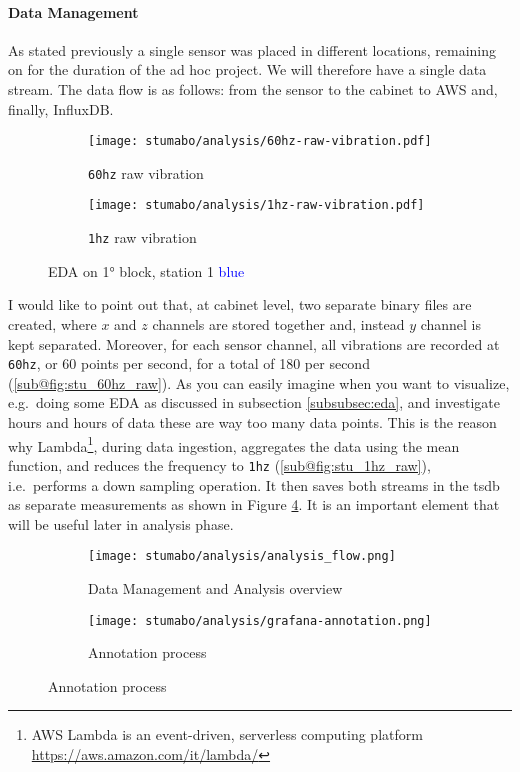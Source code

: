 \paragraph{Data Management}
As stated previously a single sensor was placed in different locations, remaining on for the duration of the ad hoc project. We will therefore have a single data stream.
The data flow is as follows: from the sensor to the cabinet to AWS and, finally, InfluxDB.
\begin{figure}[ht]
    \begin{subfigure}{.495\textwidth}
        \texttt{[image: stumabo/analysis/60hz-raw-vibration.pdf]}
        \caption{\texttt{60hz} raw vibration}
        \label{fig:stu_60hz_raw}
    \end{subfigure}
    \begin{subfigure}{.495\textwidth}
        \texttt{[image: stumabo/analysis/1hz-raw-vibration.pdf]}
        \caption{\texttt{1hz} raw vibration}
        \label{fig:stu_1hz_raw}
    \end{subfigure}
    \caption{\acl{EDA} on 1° block, station 1 \textcolor{blue}{blue}}
    \label{fig:stu_2_raw_data}
\end{figure}
I would like to point out that, at cabinet level, two separate binary files are created, where $x$ and $z$ channels are stored together and, instead $y$ channel is kept separated. 
Moreover, for each sensor channel, all vibrations are recorded at \texttt{60hz}, or 60 points per second, for a total of 180 per second (\ref{sub@fig:stu_60hz_raw}).
As you can easily imagine when you want to visualize, e.g.\ doing some \ac{EDA} as discussed in subsection \ref{subsubsec:eda}, 
and investigate hours and hours of data these are way too many data points.
This is the reason why Lambda\footnote{AWS Lambda is an event-driven, serverless computing platform \url{https://aws.amazon.com/it/lambda/}}, 
during data ingestion, aggregates the data using the mean function, and reduces the frequency to \texttt{1hz} (\ref{sub@fig:stu_1hz_raw}), i.e.\ 
performs a down sampling operation. It then saves both streams in the \ac{tsdb} as separate measurements as shown in Figure \ref{fig:stu_aly_overview}. 
It is an important element that will be useful later in analysis phase.

\begin{figure}[ht]
    \begin{subfigure}{.495\textwidth}
        \texttt{[image: stumabo/analysis/analysis\_flow.png]}
        \caption{Data Management and Analysis overview}
        \label{fig:stu_aly_overview}
    \end{subfigure}
    \begin{subfigure}{.495\textwidth}
        \texttt{[image: stumabo/analysis/grafana-annotation.png]} 
        \caption{Annotation process}
        \label{fig:stu_annotation}
    \end{subfigure}
\end{figure}

